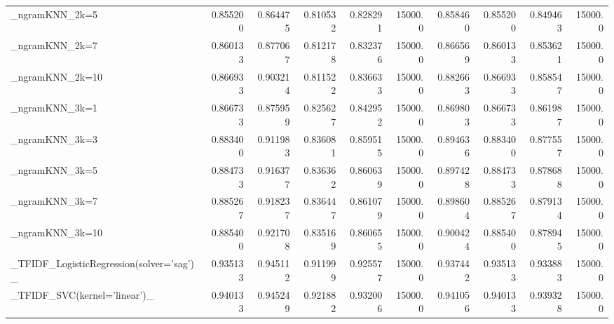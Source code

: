 \begin{tabular}{lrrrrrrrrr}
\_ngramKNN\_2k=5                                     &  0.855200 &         0.864475 &      0.810532 &        0.828291 &        15000.0 &            0.858460 &         0.855200 &           0.849463 &           15000.0 \\
\_ngramKNN\_2k=7                                     &  0.860133 &         0.877067 &      0.812178 &        0.832376 &        15000.0 &            0.866569 &         0.860133 &           0.853621 &           15000.0 \\
\_ngramKNN\_2k=10                                    &  0.866933 &         0.903214 &      0.811522 &        0.836633 &        15000.0 &            0.882663 &         0.866933 &           0.858547 &           15000.0 \\
\_ngramKNN\_3k=1                                     &  0.866733 &         0.875959 &      0.825627 &        0.842952 &        15000.0 &            0.869803 &         0.866733 &           0.861987 &           15000.0 \\
\_ngramKNN\_3k=3                                     &  0.883400 &         0.911983 &      0.836081 &        0.859515 &        15000.0 &            0.894636 &         0.883400 &           0.877557 &           15000.0 \\
\_ngramKNN\_3k=5                                     &  0.884733 &         0.916377 &      0.836362 &        0.860639 &        15000.0 &            0.897428 &         0.884733 &           0.878688 &           15000.0 \\
\_ngramKNN\_3k=7                                     &  0.885267 &         0.918237 &      0.836447 &        0.861079 &        15000.0 &            0.898604 &         0.885267 &           0.879134 &           15000.0 \\
\_ngramKNN\_3k=10                                    &  0.885400 &         0.921708 &      0.835169 &        0.860655 &        15000.0 &            0.900424 &         0.885400 &           0.878945 &           15000.0 \\
\_TFIDF\_LogisticRegression(solver='sag')\_           &  0.935133 &         0.945112 &      0.911999 &        0.925577 &        15000.0 &            0.937442 &         0.935133 &           0.933883 &           15000.0 \\
\_TFIDF\_SVC(kernel='linear')\_                       &  0.940133 &         0.945249 &      0.921882 &        0.932006 &        15000.0 &            0.941056 &         0.940133 &           0.939328 &           15000.0 \\

\end{tabular}
